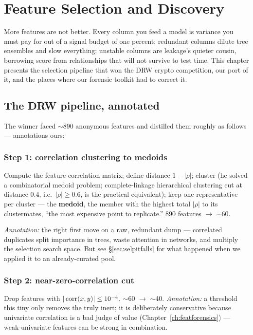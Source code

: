 \chapter{Feature Selection and Discovery}
\label{ch:selection}

More features are not better. Every column you feed a model is variance you
must pay for out of a signal budget of one percent; redundant columns
dilute tree ensembles and slow everything; unstable columns are leakage's
quieter cousin, borrowing score from relationships that will not survive to
test time. This chapter presents the selection pipeline that won the DRW
crypto competition, our port of it, and the places where our forensic
toolkit had to correct it.

\section{The DRW pipeline, annotated}

The winner faced $\sim$890 anonymous features and distilled them roughly as
follows --- annotations ours:

\subsection{Step 1: correlation clustering to medoids}

Compute the feature correlation matrix; define distance $1 - |\rho|$;
cluster (he solved a combinatorial medoid problem; complete-linkage
hierarchical clustering cut at distance $0.4$, i.e.\ $|\rho| \ge 0.6$, is
the practical equivalent); keep one representative per cluster --- the
\textbf{medoid}, the member with the highest total $|\rho|$ to its
clustermates, ``the most expensive point to replicate.'' 890 features
$\to$ $\sim$60.

\emph{Annotation:} the right first move on a raw, redundant dump ---
correlated duplicates split importance in trees, waste attention in
networks, and multiply the selection search space. But see
\S\ref{sec:selpitfalls} for what happened when we applied it to an
already-curated pool.

\subsection{Step 2: near-zero-correlation cut}

Drop features with $|\operatorname{corr}(x, y)| \le 10^{-4}$. $\sim$60 $\to$ $\sim$40.
\emph{Annotation:} a threshold this tiny only removes the truly inert; it
is deliberately conservative because univariate correlation is a bad judge
of value (Chapter~\ref{ch:featforensics}) --- weak-univariate features can
be strong in combination.

